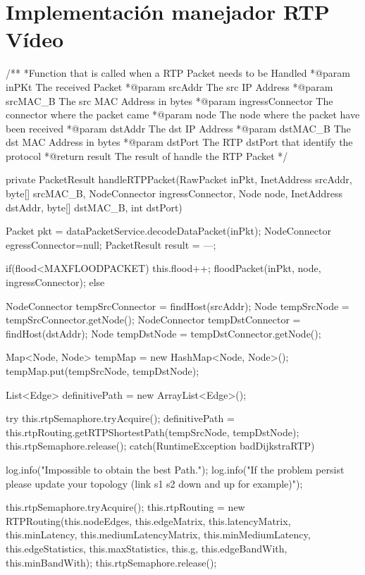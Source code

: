 \documentclass[a4paper,11pt]{book}
\begin{document}
\section{Implementación manejador \ac{RTP} Vídeo}\label{rtpVideoCode}
\begin{java}
/**
    *Function that is called when a RTP Packet needs to be Handled
    *@param inPKt The received Packet
    *@param srcAddr The src IP Address
    *@param srcMAC_B The src MAC Address in bytes
    *@param ingressConnector The connector where the packet came
    *@param node The node where the packet have been received
    *@param dstAddr The dst IP Address
    *@param dstMAC_B The dst MAC Address in bytes
    *@param dstPort The RTP dstPort that identify the protocol
    *@return result The result of handle the RTP Packet
    */

    private PacketResult handleRTPPacket(RawPacket inPkt, InetAddress srcAddr, byte[] srcMAC_B,
    NodeConnector ingressConnector, Node node, InetAddress dstAddr, byte[] dstMAC_B, int dstPort){

      Packet pkt = dataPacketService.decodeDataPacket(inPkt);
      NodeConnector egressConnector=null;
      PacketResult result = ---;

      if(flood<MAXFLOODPACKET){
        this.flood++;
        floodPacket(inPkt, node, ingressConnector);
      }else{

        NodeConnector tempSrcConnector = findHost(srcAddr);
        Node tempSrcNode = tempSrcConnector.getNode();
        NodeConnector tempDstConnector = findHost(dstAddr);
        Node tempDstNode = tempDstConnector.getNode();

        Map<Node, Node> tempMap = new HashMap<Node, Node>();
			  tempMap.put(tempSrcNode, tempDstNode);

			  List<Edge> definitivePath = new ArrayList<Edge>();

        try{
          this.rtpSemaphore.tryAcquire();
          definitivePath = this.rtpRouting.getRTPShortestPath(tempSrcNode, tempDstNode);
          this.rtpSemaphore.release();
        }
        catch(RuntimeException badDijkstraRTP){
          log.info("Impossible to obtain the best Path.");
          log.info("If the problem persist please update your topology (link s1 s2 down and up for example)");

          this.rtpSemaphore.tryAcquire();
          this.rtpRouting = new RTPRouting(this.nodeEdges, this.edgeMatrix, this.latencyMatrix, this.minLatency,
          this.mediumLatencyMatrix, this.minMediumLatency, this.edgeStatistics, this.maxStatistics, this.g, this.edgeBandWith, this.minBandWith);
          this.rtpSemaphore.release();

}}}
\end{java}
\end{document}
